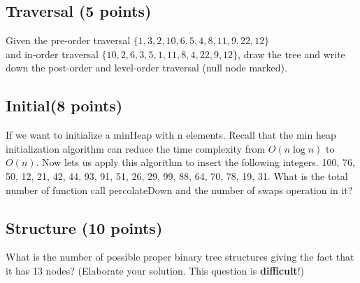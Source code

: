 \documentclass[11pt]{exam}
\begin{document}
\subsection{Traversal (5 points)}
Given the pre-order traversal $\{1,3,2,10,6,5,4,8,11,9,22,12\}$\\
and in-order traversal
$\{10,2,6,3,5,1,11,8,4,22,9,12\}$, draw the tree and write down the post-order
and level-order traversal (null node marked).
\begin{solution}
\end{solution}
\subsection{Initial(8 points)}
If we want to initialize a minHeap with n elements. Recall that the min heap initialization
algorithm can reduce the time complexity from $O(n\log n)$ to $O(n)$. Now lets us apply this
algorithm to insert the following integers.
100, 76, 50, 12, 21, 42, 44, 93, 91, 51, 26, 29, 99, 88, 64, 70, 78, 19, 31.
What is the total number of function call percolateDown and the number of swaps operation
in it?
\begin{solution}
\end{solution}
\subsection{Structure (10 points)}
What is the number of possible proper binary tree structures giving the fact that it has 13 nodes?
(Elaborate your solution. This question is \textbf{difficult}!)
\begin{solution}
\end{solution}
\end{document}
